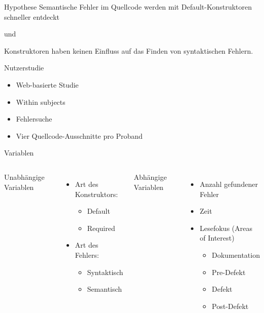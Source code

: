 \documentclass[10pt]{beamer}
\begin{document}
	\begin{frame}[standout]{Hypothese}
		Semantische Fehler im Quellcode werden mit Default-Konstruktoren schneller entdeckt
		\begin{center}\small{und}\end{center}
		Konstruktoren haben keinen Einfluss auf das Finden von syntaktischen Fehlern.
	\end{frame}

	\begin{frame}{Nutzerstudie}
		\begin{itemize}
			\item Web-basierte Studie\\
			\vspace{\baselineskip}
			\item Within subjects
			\vspace{\baselineskip}
			\item Fehlersuche\\
			\vspace{\baselineskip}
			\item Vier Quellcode-Ausschnitte pro Proband\\
		\end{itemize}
	\end{frame}

	\begin{frame}{Variablen}
		\begin{columns}[T,onlytextwidth]
	
			Unabhängige Variablen
			\begin{itemize}
				\item Art des Konstruktors:
				\begin{itemize}
					\item Default
					\item Required
				\end{itemize}
				\item Art des Fehlers:
				\begin{itemize}
					\item Syntaktisch
					\item Semantisch
				\end{itemize}
			\end{itemize}			
		
			Abhängige Variablen
			\begin{itemize}
				\item Anzahl gefundener Fehler
				\item Zeit
				\item Lesefokus (Areas of Interest)
				\begin{itemize}
					\item Dokumentation
					\item Pre-Defekt
					\item Defekt
					\item Post-Defekt
				\end{itemize}
			\end{itemize}
			
		\end{columns}	
	\end{frame}
\end{document}
